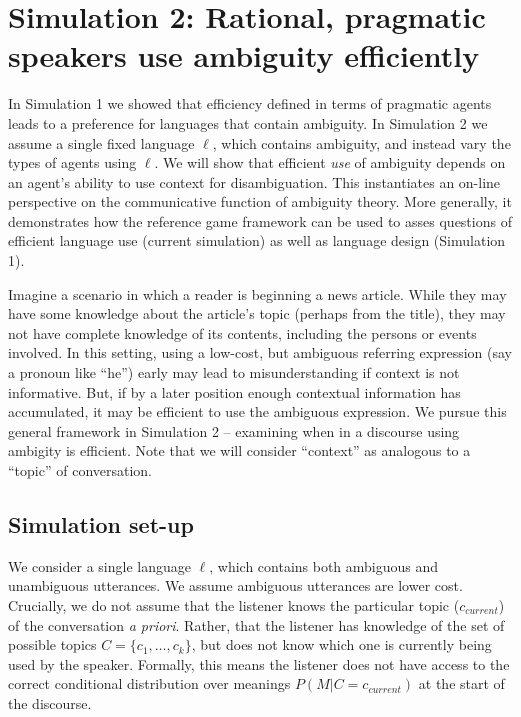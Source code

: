 \documentclass[10pt, letterpaper]{article}
\begin{document}
\section{Simulation 2: Rational, pragmatic speakers use ambiguity
efficiently}\label{simulation-2-rational-pragmatic-speakers-use-ambiguity-efficiently}

In Simulation 1 we showed that efficiency defined in terms of pragmatic
agents leads to a preference for languages that contain ambiguity. In
Simulation 2 we assume a single fixed language \(\ell\), which contains
ambiguity, and instead vary the types of agents using \(\ell\). We will
show that efficient \emph{use} of ambiguity depends on an agent's
ability to use context for disambiguation. This instantiates an on-line
perspective on the communicative function of ambiguity theory. More
generally, it demonstrates how the reference game framework can be used
to asses questions of efficient language use (current simulation) as
well as language design (Simulation 1).\par

Imagine a scenario in which a reader is beginning a news article. While
they may have some knowledge about the article's topic (perhaps from the
title), they may not have complete knowledge of its contents, including
the persons or events involved. In this setting, using a low-cost, but
ambiguous referring expression (say a pronoun like ``he'') early may
lead to misunderstanding if context is not informative. But, if by a
later position enough contextual information has accumulated, it may be
efficient to use the ambiguous expression. We pursue this general
framework in Simulation 2 -- examining when in a discourse using
ambigity is efficient. Note that we will consider ``context'' as
analogous to a ``topic'' of conversation. \par

\subsection{Simulation set-up}\label{simulation-set-up-1}

We consider a single language \(\ell\), which contains both ambiguous
and unambiguous utterances. We assume ambiguous utterances are lower
cost. Crucially, we do not assume that the listener knows the particular
topic (\(c_{current}\)) of the conversation \textit{a priori}. Rather,
that the listener has knowledge of the set of possible topics
\(C = \{c_1, \dots, c_k\}\), but does not know which one is currently
being used by the speaker. Formally, this means the listener does not
have access to the correct conditional distribution over meanings
\(P(M|C=c_{current})\) at the start of the discourse.\par 
\end{document}
